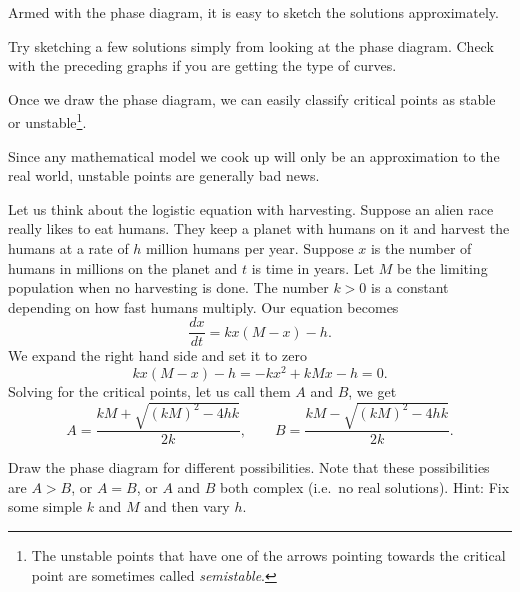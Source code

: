 \documentclass[12pt]{book}
\begin{document}
\begin{center}
\end{center}

Armed with the phase diagram,
it is easy to sketch the solutions approximately.

\begin{exercise}
Try sketching a few solutions simply from looking at the phase diagram.
Check with the preceding graphs if
you are getting the type of curves.
\end{exercise}

Once we draw the phase diagram, we can easily classify critical points
as stable or unstable\footnote{The unstable 
points that have one of the
arrows pointing towards the critical point are sometimes called
\emph{semistable}.}.  

\begin{center}
\end{center}

Since any mathematical model we cook up will only be an approximation
to the real world, unstable points are generally bad news.

\medskip

Let us think about the logistic equation
with harvesting.
Suppose an alien race really likes to
eat humans.  They keep a planet with humans on it and harvest the
humans at a rate of $h$ million humans per
year.  Suppose $x$
is the number of humans in millions on the planet and $t$ is time in years.
Let $M$ be the limiting
population when no harvesting is done.  The number $k > 0$ is a
constant depending
on how fast humans multiply.  Our equation becomes
\begin{equation*}
\frac{dx}{dt} = kx(M-x) - h .
\end{equation*}
We expand the right hand side and set it to zero
\begin{equation*}
kx(M-x) - h = -kx^2+kMx - h  = 0.
\end{equation*}
Solving for
the critical points,
let us call them $A$ and $B$, we get
\begin{equation*}
A = \frac{kM + \sqrt{{(kM)}^2 - 4hk}}{2k}, \qquad
B = \frac{kM - \sqrt{{(kM)}^2 - 4hk}}{2k} .
\end{equation*}

\begin{exercise}
Draw the phase diagram for different possibilities.  Note
that these possibilities are $A > B$, or $A=B$, or $A$ and $B$ both complex
(i.e.\ no real solutions).  Hint: Fix some simple $k$ and $M$ and then vary
$h$.
\end{exercise}
\end{document}
